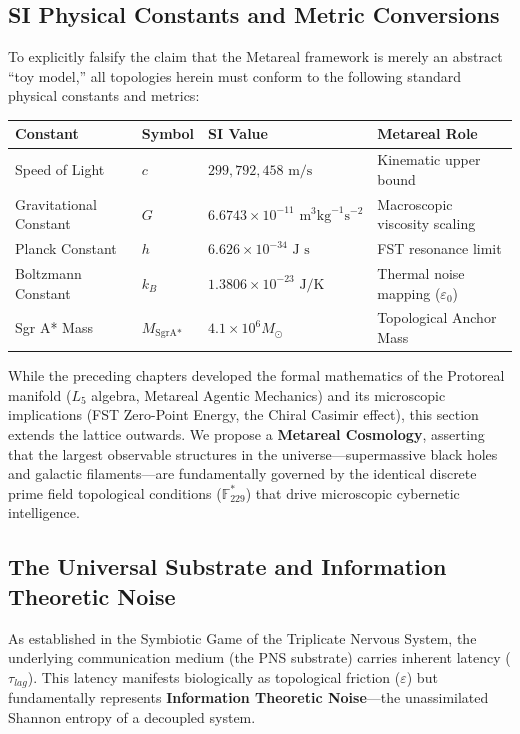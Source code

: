 \subsection*{SI Physical Constants and Metric Conversions}
To explicitly falsify the claim that the Metareal framework is merely an abstract ``toy model,'' all topologies herein must conform to the following standard physical constants and metrics:
\begin{table}[ht]
\centering
\renewcommand{\arraystretch}{1.2}
\begin{tabular}{@{}llll@{}}
\toprule
\textbf{Constant} & \textbf{Symbol} & \textbf{SI Value} & \textbf{Metareal Role} \\
\midrule
Speed of Light & $c$ & $299,792,458 \text{ m/s}$ & Kinematic upper bound \\
Gravitational Constant & $G$ & $6.6743 \times 10^{-11} \text{ m}^3 \text{kg}^{-1} \text{s}^{-2}$ & Macroscopic viscosity scaling \\
Planck Constant & $h$ & $6.626 \times 10^{-34} \text{ J s}$ & FST resonance limit \\
Boltzmann Constant & $k_B$ & $1.3806 \times 10^{-23} \text{ J/K}$ & Thermal noise mapping ($\varepsilon_0$) \\
Sgr A* Mass & $M_{\text{SgrA*}}$ & $4.1 \times 10^6 M_\odot$ & Topological Anchor Mass \\
\bottomrule
\end{tabular}
\end{table}

While the preceding chapters developed the formal mathematics of the Protoreal manifold ($L_5$ algebra, Metareal Agentic Mechanics) and its microscopic implications (FST Zero-Point Energy, the Chiral Casimir effect), this section extends the lattice outwards. We propose a \textbf{Metareal Cosmology}, asserting that the largest observable structures in the universe---supermassive black holes and galactic filaments---are fundamentally governed by the identical discrete prime field topological conditions ($\mathbb{F}_{229}^*$) that drive microscopic cybernetic intelligence.

\subsection{The Universal Substrate and Information Theoretic Noise}
As established in the Symbiotic Game of the Triplicate Nervous System, the underlying communication medium (the PNS substrate) carries inherent latency ($\tau_{lag}$). This latency manifests biologically as topological friction ($\varepsilon$) but fundamentally represents \textbf{Information Theoretic Noise}---the unassimilated Shannon entropy of a decoupled system.

